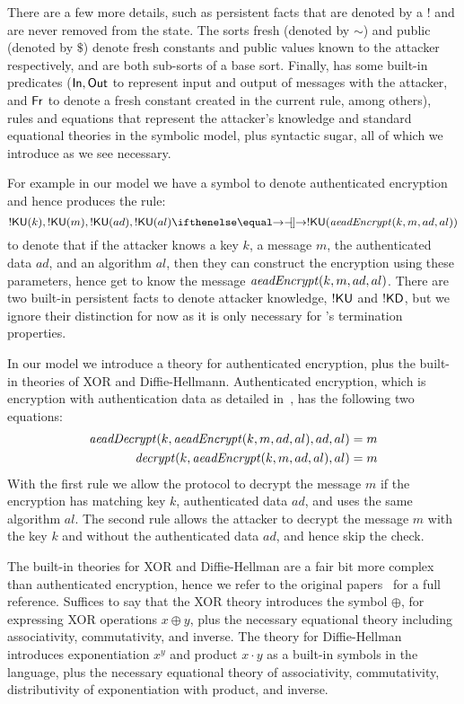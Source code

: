 There are a few more details, such as persistent facts that are denoted by a $!$
and are never removed from the state.
%
The sorts fresh (denoted by $\sim$) and public (denoted by $\$$) denote fresh
constants and public values known to the attacker respectively, and are both
sub-sorts of a base sort.
%
Finally, \mTamarin{} has some built-in predicates ($\mathsf{In},
\mathsf{Out}$ to represent input and output of messages with the attacker,
and
$\mathsf{Fr}$ to denote a fresh constant created in the current rule, among
others), rules and equations that represent the attacker's knowledge
and standard equational theories in the symbolic model, plus syntactic
sugar, all of which we introduce as we see necessary.

For example in our model we have a symbol to denote authenticated encryption and
hence \mTamarin{} produces the rule:
%
\[ !\mKU( k ), !\mKU( m ), !\mKU( ad ), !\mKU( al ) \ifarrow !\mKU( \mAeadEncrypt(k, m, ad, al) ) \]
%
to denote that if the attacker knows a key $k$, a message
$m$, the authenticated data $ad$, and an algorithm
$al$, then they can construct the encryption using these parameters, hence get
to know the message $\mathit{aeadEncrypt}(k, m, ad, al)$.
%
There are two built-in persistent facts to denote attacker knowledge,
$!\mathsf{KU}$ and
$!\mathsf{KD}$, but we ignore their distinction for now as it is only necessary for
\mTamarin's termination properties.

In our model we introduce a theory for authenticated encryption, plus the
built-in theories of XOR and Diffie-Hellmann.
%
Authenticated encryption, which is encryption with authentication data as
detailed in~\cite{aead}, has the following two equations:
\begin{align*}
  \mathit{aeadDecrypt}(k, \mathit{aeadEncrypt}(k, m, ad, al), ad, al) = m\\
  \mathit{decrypt}(k, \mathit{aeadEncrypt}(k, m, ad, al), al) = m
\end{align*}
With the first rule we allow the protocol to decrypt the message $m$ if the
encryption has matching key $k$, authenticated data $ad$, and uses the same
algorithm $al$.
%
The second rule allows the attacker to decrypt the message $m$ with the key $k$
and without the authenticated data $ad$, and hence skip the check.

The built-in theories for XOR and Diffie-Hellman are a fair bit more complex
than authenticated encryption, hence we refer to the original
papers~\cite{xorTamarin,dhTamarin} for a full reference.
%
Suffices to say that the XOR theory introduces the symbol $\oplus$, for
expressing XOR operations $x \oplus y$, plus the necessary equational theory
including associativity, commutativity, and inverse.
%
The theory for Diffie-Hellman introduces exponentiation $x^y$ and product
$x \cdot y$ as a built-in symbols in the language, plus the necessary equational
theory of associativity, commutativity, distributivity of exponentiation with
product, and inverse.

